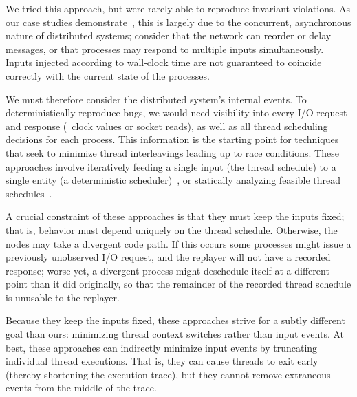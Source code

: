 We tried this approach, but were rarely
able to reproduce invariant violations. As our case studies
demonstrate~\cite{sts2014}, this is largely due
to the concurrent, asynchronous nature of distributed systems; consider that the network
can reorder or delay messages, or that processes may
respond to multiple inputs simultaneously.
Inputs injected according to wall-clock time are not guaranteed to
coincide correctly with the current state of the processes.

We must therefore consider the distributed system's internal events. To deterministically
reproduce bugs, we would need visibility into every I/O request and response (\eg~clock
values or socket reads), as well as all thread scheduling
decisions for each process. This information is the starting point for
techniques that seek  to minimize thread interleavings leading up to race conditions.
These approaches involve iteratively feeding a single input (the thread
schedule) to a single entity (a deterministic scheduler)~\cite{choi2002isolating,claessen2009finding,jalbert2010trace}, or
statically analyzing feasible thread schedules~\cite{huang2011efficient}.

A crucial constraint of these approaches is that they must keep the inputs
fixed; that is, behavior must depend uniquely on the thread
schedule. Otherwise, the nodes may take a divergent code path. If this
occurs some processes might issue a previously unobserved I/O request, and the replayer will not
have a recorded response; worse yet, a divergent process might deschedule
itself at a different point than it did originally, so that the remainder of
the recorded thread schedule is unusable to the replayer.

Because they keep the inputs fixed, these approaches strive for a
subtly different goal than
ours: minimizing thread context switches rather than input events.
At best, these approaches can indirectly minimize input events by truncating
individual thread executions. That is, they can cause threads to exit early
(thereby shortening the execution trace), but they cannot remove extraneous events from
the middle of the trace.


